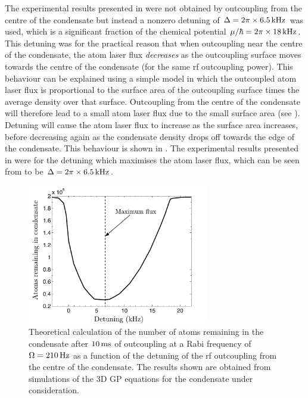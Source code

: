 The experimental results presented in  were not obtained by outcoupling from the centre of the condensate but instead a nonzero detuning of $\Delta = 2 \pi \times \unit[6.5]{kHz}$ was used, which is a significant fraction of the chemical potential $\mu/\hbar = 2\pi \times \unit[18]{kHz}$. This detuning was for the practical reason that when outcoupling near the centre of the condensate, the atom laser flux \emph{decreases} as the outcoupling surface moves towards the centre of the condensate (for the same rf outcoupling power). This behaviour can be explained using a simple model in which the  outcoupled atom laser flux is proportional to the surface area of the outcoupling surface times the average density over that surface. Outcoupling from the centre of the condensate will therefore lead to a small atom laser flux due to the small surface area (see ). Detuning will cause the atom laser flux to increase as the surface area increases, before decreasing again as the condensate density drops off towards the edge of the condensate. This behaviour is shown in . The experimental results presented in  were for the detuning which maximises the atom laser flux, which can be seen from  to be $\Delta = 2\pi \times \unit[6.5]{kHz}$.

\begin{figure}
    \centering
    \includegraphics[width=8cm]{DetuningCurve}
    \caption{Theoretical calculation of the number of atoms remaining in the condensate after $\unit[10]{ms}$ of outcoupling at a Rabi frequency of $\Omega = \unit[210]{Hz}$ as a function of the detuning of the rf outcoupling from the centre of the condensate. The results shown are obtained from simulations of the 3D GP equations for the condensate under consideration. \label{Peaks:DetuningCurve}}
\end{figure}

